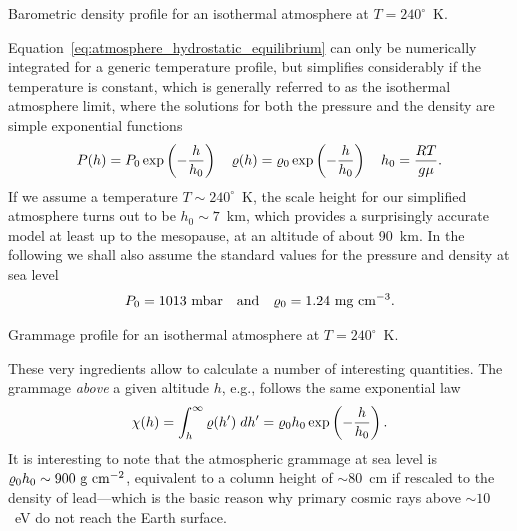 \begin{marginfigure}
  
  \caption{Barometric density profile for an isothermal atmosphere at $T = 240^\circ$~K.}
  \label{fig:atmospheric_density}
\end{marginfigure}

Equation~\eqref{eq:atmosphere_hydrostatic_equilibrium} can only be numerically integrated
for a generic temperature profile, but simplifies considerably if the temperature
is constant, which is generally referred to as the isothermal atmosphere limit,
where the solutions for both the pressure and the density are simple exponential
functions
\begin{align}
  P(h) = P_0 \exp\left(-\frac{h}{h_0}\right)\quad
  \varrho(h) = \varrho_0 \exp\left(-\frac{h}{h_0}\right)\quad
  h_0 = \frac{RT}{g\mu}.
\end{align}
If we assume a temperature $T \sim 240^\circ$~K, the scale height for our simplified
atmosphere turns out to be $h_0 \sim 7$~km, which provides a surprisingly accurate
model at least up to the mesopause, at an altitude of about 90~km. In the following
we shall also assume the standard values for the pressure and density at sea level
\begin{align}
  P_0 = 1013~\text{mbar}
  \quad\text{and}\quad
  \varrho_0 = 1.24~\text{mg~cm}^{-3}.
\end{align}

\begin{marginfigure}
  
  \caption{Grammage profile for an isothermal atmosphere at $T = 240^\circ$~K.}
  \label{fig:atmospheric_grammage}
\end{marginfigure}

These very ingredients allow to calculate a number of interesting quantities.
The grammage \emph{above} a given altitude $h$, e.g., follows the same exponential
law
\begin{align}\label{eq:atmospheric_grammage}
  \chi(h) = \int_h^\infty \varrho(h') \;d{h'} =
  \varrho_0 h_0 \exp\left(-\frac{h}{h_0}\right).
\end{align}
It is interesting to note that the atmospheric grammage at sea level is
$\varrho_0 h_0 \sim 900~\text{g~cm}^{-2}$, equivalent to a column height of
$\sim 80$~cm if rescaled to the density of lead---which is the basic reason why
primary cosmic rays above $\sim 10$~eV do not reach the Earth surface.



